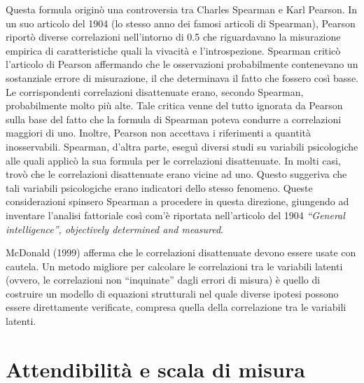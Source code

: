 Questa formula originò una controversia tra Charles Spearman e Karl Pearson.
 In un suo articolo del 1904 (lo stesso anno dei famosi articoli di
  Spearman), Pearson riportò diverse correlazioni nell'intorno di 0.5
  che riguardavano la misurazione empirica di caratteristiche quali la vivacità
  e l'introspezione.
   Spearman criticò l'articolo di Pearson affermando che le
    osservazioni probabilmente contenevano un sostanziale errore di
    misurazione, il che determinava il fatto che fossero così basse.
 Le corrispondenti correlazioni disattenuate erano, secondo
  Spearman, probabilmente molto più alte.
Tale critica venne del tutto ignorata da Pearson sulla base
    del fatto che la formula di Spearman poteva condurre a
    correlazioni maggiori di uno.
 Inoltre, Pearson non accettava i riferimenti a quantità inosservabili.
Spearman, d'altra parte, eseguì diversi studi su variabili psicologiche alle quali applicò la sua formula per le correlazioni disattenuate. 
In molti casi, trovò che le correlazioni disattenuate erano vicine ad uno.
Questo suggeriva che tali variabili psicologiche erano indicatori dello stesso fenomeno.
Queste considerazioni spinsero Spearman a procedere in questa direzione, giungendo  ad inventare l'analisi fattoriale così com'è riportata nell'articolo del 1904  \emph{``General intelligence'', objectively determined and measured}.

\bigskip

McDonald (1999) afferma che le correlazioni disattenuate devono essere usate con cautela.
Un metodo migliore  per calcolare le correlazioni tra le variabili latenti (ovvero, le correlazioni non ``inquinate'' dagli errori di misura) è quello di costruire un modello di equazioni strutturali nel quale diverse ipotesi possono essere direttamente verificate, compresa quella della correlazione tra le variabili latenti.


\section{Attendibilità e scala di misura}

